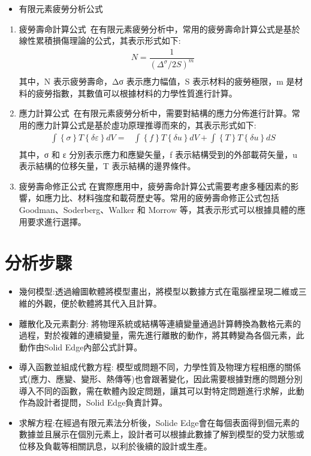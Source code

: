 \begin{itemize}
\item 有限元素疲勞分析公式
\end{itemize}
\begin{enumerate}

\item 疲勞壽命計算公式\
在有限元素疲勞分析中，常用的疲勞壽命計算公式是基於線性累積損傷理論的公式，其表示形式如下:\\
\[
\begin{aligned}
N=\dfrac{1}{\left( \Delta ^{\sigma }/2S\right) ^{m}}\\
\end{aligned}
\]
其中，N 表示疲勞壽命，Δσ 表示應力幅值，S 表示材料的疲勞極限，m 是材料的疲勞指數，其數值可以根據材料的力學性質進行計算。\\

\item 應力計算公式\
在有限元素疲勞分析中，需要對結構的應力分佈進行計算。常用的應力計算公式是基於虛功原理推導而來的，其表示形式如下:\\
\[
\begin{aligned}
\int \left\{ \sigma \right\} T\left\{ \delta \varepsilon \right\} dV=&\int \left\{ f\right\} T\left\{ \delta u\right\} dV+\int \left\{ T\right\} T\left\{ \delta u\right\} dS\\
\end{aligned}
\]
其中，{σ} 和 {ε} 分別表示應力和應變矢量，{f} 表示結構受到的外部載荷矢量，{u} 表示結構的位移矢量，{T} 表示結構的邊界條件。\\

\item 疲勞壽命修正公式
在實際應用中，疲勞壽命計算公式需要考慮多種因素的影響，如應力比、材料強度和載荷歷史等。常用的疲勞壽命修正公式包括 Goodman、Soderberg、Walker 和 Morrow 等，其表示形式可以根據具體的應用要求進行選擇。
\end{enumerate}

\section{分析步驟}
\begin{itemize}
\item 幾何模型:透過繪圖軟體將模型畫出，將模型以數據方式在電腦裡呈現二維或三維的外觀，便於軟體將其代入且計算。
\item 離散化及元素劃分: 將物理系統或結構等連續變量通過計算轉換為數格元素的過程，對於複雜的連續變量，需先進行離散的動作，將其轉變為各個元素，此動作由Solid Edge內部公式計算。
\item 導入函數並組成代數方程: 模型或問題不同，力學性質及物理方程相應的關係式(應力、應變、變形、熱傳等)也會跟著變化，因此需要根據對應的問題分別導入不同的函數，需在軟體內設定問題，讓其可以對特定問題進行求解，此動作為設計者提問，Solid Edge負責計算。
\item 求解方程:在經過有限元素法分析後，Solide Edge會在每個表面得到個元素的數據並且展示在個別元素上，設計者可以根據此數據了解到模型的受力狀態或位移及負載等相關訊息，以利於後續的設計或生產。
\end{itemize}
\newpage
